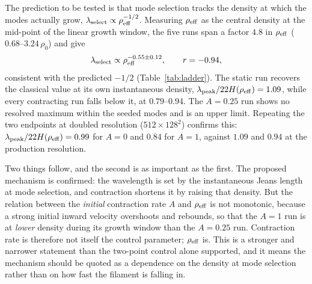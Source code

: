 \documentclass[usenatbib,twoside,twocolumn]{mnras}
\begin{document}
The prediction to be tested is that mode selection tracks the density at which the modes actually grow, $\lambda_{\rm select}\propto\rho_{\rm eff}^{-1/2}$. Measuring $\rho_{\rm eff}$ as the central density at the mid-point of the linear growth window, the five runs span a factor $4.8$ in $\rho_{\rm eff}$ ($0.68$--$3.24\,\rho_0$) and give
\begin{equation}
\lambda_{\rm select}\propto\rho_{\rm eff}^{-0.55\pm0.12},\qquad r=-0.94,
\label{eq:ladderfit}
\end{equation}
consistent with the predicted $-1/2$ (Table~\ref{tab:ladder}). The static run recovers the classical value at its own instantaneous density, $\lambda_{\rm peak}/22H(\rho_{\rm eff})=1.09$, while every contracting run falls below it, at $0.79$--$0.94$. The $A=0.25$ run shows no resolved maximum within the seeded modes and is an upper limit. Repeating the two endpoints at doubled resolution ($512\times128^2$) confirms this: $\lambda_{\rm peak}/22H(\rho_{\rm eff})=0.99$ for $A=0$ and $0.84$ for $A=1$, against $1.09$ and $0.94$ at the production resolution.

Two things follow, and the second is as important as the first. The proposed mechanism is confirmed: the wavelength is set by the instantaneous Jeans length at mode selection, and contraction shortens it by raising that density. But the relation between the \emph{initial} contraction rate $A$ and $\rho_{\rm eff}$ is not monotonic, because a strong initial inward velocity overshoots and rebounds, so that the $A=1$ run is at \emph{lower} density during its growth window than the $A=0.25$ run. Contraction rate is therefore not itself the control parameter; $\rho_{\rm eff}$ is. This is a stronger and narrower statement than the two-point control alone supported, and it means the mechanism should be quoted as a dependence on the density at mode selection rather than on how fast the filament is falling in.
\end{document}

